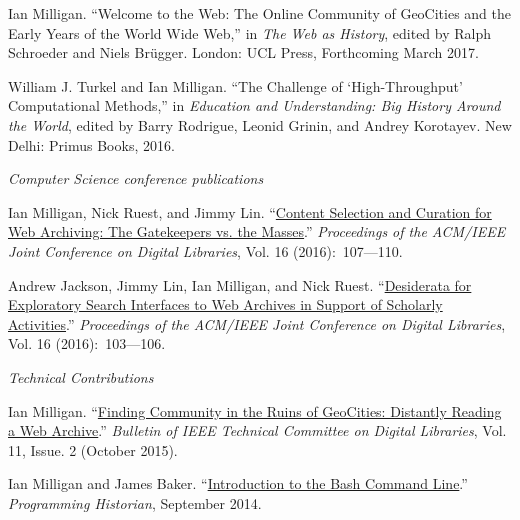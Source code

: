 \documentclass[11pt,article,oneside]{memoir}
\begin{document}
\ind Ian Milligan. ``Welcome to the Web: The Online Community of GeoCities and the Early Years of the World Wide Web,'' in \emph{The Web as History}, edited by Ralph Schroeder and Niels Br\"ugger. London: UCL Press, Forthcoming March 2017.

\ind William J. Turkel and Ian Milligan. ``The Challenge of `High-Throughput' Computational Methods,'' in \emph{Education and Understanding: Big History Around the World}, edited by Barry Rodrigue, Leonid Grinin, and Andrey Korotayev. New Delhi: Primus Books, 2016.


\bigskip 

\noindent\emph{Computer Science conference publications \vspace{0.05in}}

\ind Ian Milligan, Nick Ruest, and Jimmy Lin. ``\href{http://dl.acm.org/citation.cfm?id=2910913&CFID=806438388&CFTOKEN=32226772}{Content Selection and Curation for Web Archiving: The Gatekeepers vs. the Masses}.'' \emph{Proceedings of the ACM/IEEE Joint Conference on Digital Libraries}, Vol. 16 (2016):~107---110.

\ind Andrew Jackson, Jimmy Lin, Ian Milligan, and Nick Ruest. ``\href{http://dl.acm.org/citation.cfm?id=2910912&CFID=806438388&CFTOKEN=32226772}{Desiderata for Exploratory Search Interfaces to Web Archives in Support of Scholarly Activities}.'' \emph{Proceedings of the ACM/IEEE Joint Conference on Digital Libraries}, Vol. 16 (2016):~103---106.


\bigskip 

\noindent\emph{Technical Contributions \vspace{0.05in}}

\ind Ian Milligan. ``\href{http://www.ieee-tcdl.org/Bulletin/v11n2/papers/milligan.pdf}{Finding Community in the Ruins of GeoCities: Distantly Reading a Web Archive}.'' \emph{Bulletin of IEEE Technical Committee on Digital Libraries}, Vol. 11, Issue. 2  (October 2015).

\ind Ian Milligan and James Baker. ``\href{http://programminghistorian.org/lessons/intro-to-bash}{Introduction to the Bash Command Line}.'' \emph{Programming Historian}, September 2014.
\end{document}
